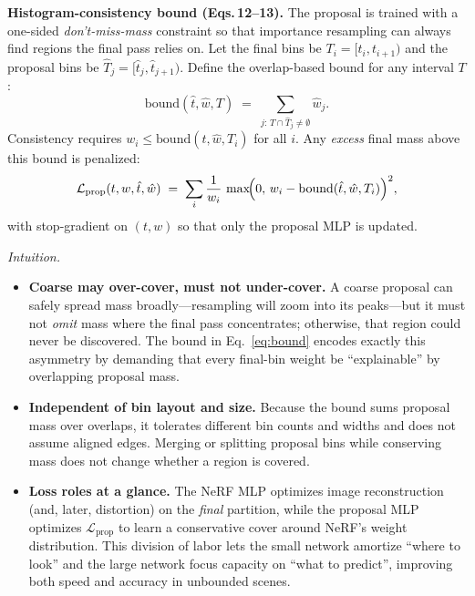 \begin{enrichment}
\begin{enrichment}
        \textbf{Histogram-consistency bound (Eqs.\,12–13).} The proposal is trained with a one-sided \emph{don’t-miss-mass} constraint so that importance resampling can always find regions the final pass relies on. Let the final bins be $T_i=[t_i,t_{i+1})$ and the proposal bins be $\hat{T}_j=[\hat{t}_j,\hat{t}_{j+1})$. Define the overlap-based bound for any interval $T$:
        \begin{equation}
            \mathrm{bound}(\hat{t},\hat{w},T)\;=\;\sum_{j:\,T\cap \hat{T}_j\neq\emptyset}\hat{w}_j.
            \label{eq:bound}
        \end{equation}
        Consistency requires $w_i \le \mathrm{bound}(\hat{t},\hat{w},T_i)$ for all $i$. Any \emph{excess} final mass above this bound is penalized:
        \begin{equation}
            \mathcal{L}_{\mathrm{prop}}(t,w,\hat{t},\hat{w})
            \;=\;
            \sum_i \frac{1}{w_i}\,\max\!\Bigl(0,\,w_i-\mathrm{bound}(\hat{t},\hat{w},T_i)\Bigr)^2,
            \label{eq:lprop}
        \end{equation}
        with stop-gradient on $(t,w)$ so that only the proposal MLP is updated.
        
        \textit{Intuition.}
        \begin{itemize}
            \item \textbf{Coarse may over-cover, must not under-cover.} A coarse proposal can safely spread mass broadly—resampling will zoom into its peaks—but it must not \emph{omit} mass where the final pass concentrates; otherwise, that region could never be discovered. The bound in Eq.~\eqref{eq:bound} encodes exactly this asymmetry by demanding that every final-bin weight be “explainable” by overlapping proposal mass.
            \item \textbf{Independent of bin layout and size.} Because the bound sums proposal mass over overlaps, it tolerates different bin counts and widths and does not assume aligned edges. Merging or splitting proposal bins while conserving mass does not change whether a region is covered.
            \item \textbf{Loss roles at a glance.} The NeRF MLP optimizes image reconstruction (and, later, distortion) on the \emph{final} partition, while the proposal MLP optimizes $\mathcal{L}_{\mathrm{prop}}$ to learn a conservative cover around NeRF’s weight distribution. This division of labor lets the small network amortize “where to look” and the large network focus capacity on “what to predict”, improving both speed and accuracy in unbounded scenes.
        \end{itemize}
        

\end{enrichment}
\end{enrichment}
